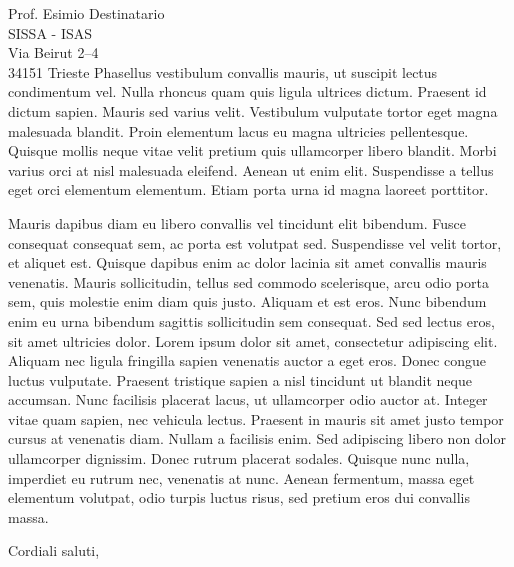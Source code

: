 \documentclass[10pt,italian,a4paper]{letteracdp}
\begin{document}
\begin{foldedletter}{
    Prof. Esimio Destinatario\\
    SISSA - ISAS\\
    Via Beirut 2--4\\
    34151 Trieste
  }
Phasellus vestibulum convallis mauris, ut suscipit lectus condimentum vel. Nulla rhoncus quam quis ligula ultrices dictum. Praesent id dictum sapien. Mauris sed varius velit. Vestibulum vulputate tortor eget magna malesuada blandit. Proin elementum lacus eu magna ultricies pellentesque. Quisque mollis neque vitae velit pretium quis ullamcorper libero blandit. Morbi varius orci at nisl malesuada eleifend. Aenean ut enim elit. Suspendisse a tellus eget orci elementum elementum. Etiam porta urna id magna laoreet porttitor.

Mauris dapibus diam eu libero convallis vel tincidunt elit bibendum. Fusce consequat consequat sem, ac porta est volutpat sed. Suspendisse vel velit tortor, et aliquet est. Quisque dapibus enim ac dolor lacinia sit amet convallis mauris venenatis. Mauris sollicitudin, tellus sed commodo scelerisque, arcu odio porta sem, quis molestie enim diam quis justo. Aliquam et est eros. Nunc bibendum enim eu urna bibendum sagittis sollicitudin sem consequat. Sed sed lectus eros, sit amet ultricies dolor. Lorem ipsum dolor sit amet, consectetur adipiscing elit. Aliquam nec ligula fringilla sapien venenatis auctor a eget eros. Donec congue luctus vulputate. Praesent tristique sapien a nisl tincidunt ut blandit neque accumsan. Nunc facilisis placerat lacus, ut ullamcorper odio auctor at. Integer vitae quam sapien, nec vehicula lectus. Praesent in mauris sit amet justo tempor cursus at venenatis diam. Nullam a facilisis enim. Sed adipiscing libero non dolor ullamcorper dignissim. Donec rutrum placerat sodales. Quisque nunc nulla, imperdiet eu rutrum nec, venenatis at nunc. Aenean fermentum, massa eget elementum volutpat, odio turpis luctus risus, sed pretium eros dui convallis massa. 
  
  \closing{Cordiali saluti,}
  
\end{foldedletter}
\end{document}
